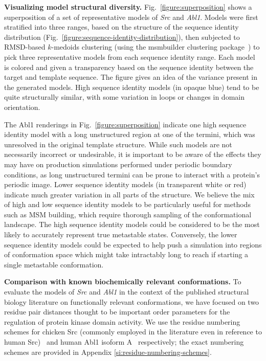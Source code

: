 \documentclass[aps,pre,twocolumn,nofootinbib,superscriptaddress,linenumbers]{revtex4-1}
\begin{document}
{\bf \color{red} Visualizing model structural diversity.}
Fig.~\ref{figure:superposition} shows a superposition of a set of representative models of \emph{Src} and \emph{Abl1}.
Models were first stratified into three ranges, based on the structure of the sequence identity distribution (Fig.~\ref{figure:sequence-identity-distribution}), then subjected to RMSD-based $k$-medoids clustering (using the msmbuilder clustering package~\cite{msmbuilder}) to pick three representative models from each sequence identity range.
Each model is colored and given a transparency based on the sequence identity between the target and template sequence.
The figure gives an idea of the variance present in the generated models.
High sequence identity models (in opaque blue) tend to be quite structurally similar, with some variation in loops or changes in domain orientation.

The Abl1 renderings in Fig.~\ref{figure:superposition} indicate one high sequence identity model with a long unstructured region at one of the termini, which was unresolved in the original template structure.
While such models are not necessarily incorrect or undesirable, it is important to be aware of the effects they may have on production simulations performed under periodic boundary conditions, as long unstructured termini can be prone to interact with a protein's periodic image.
Lower sequence identity models (in transparent white or red) indicate much greater variation in all parts of the structure.
We believe the mix of high and low sequence identity models to be particularly useful for methods such as MSM building, which require thorough sampling of the conformational landscape.
The high sequence identity models could be considered to be the most likely to accurately represent true metastable states.
Conversely, the lower sequence identity models could be expected to help push a simulation into regions of conformation space which might take intractably long to reach if starting a single metastable conformation.

\color{red}
{\bf Comparison with known biochemically relevant conformations.}
To evaluate the models of \emph{Src} and \emph{Abl1} in the context of the published structural biology literature on functionally relevant conformations, we have focused on two residue pair distances thought to be important order parameters for the regulation of protein kinase domain activity.
We use the residue numbering schemes for chicken Src (commonly employed in the literature even in reference to human Src)~\cite{xu:1999:2src, cowan-jacob:2005:1y57} and human Abl1 isoform A~\cite{young:2006:2f4j, cowan-jacob:2006:2hyy, levinson:2006:2g1t} respectively; the exact numbering schemes are provided in Appendix \ref{si:residue-numbering-schemes}.
\color{black}
\end{document}
